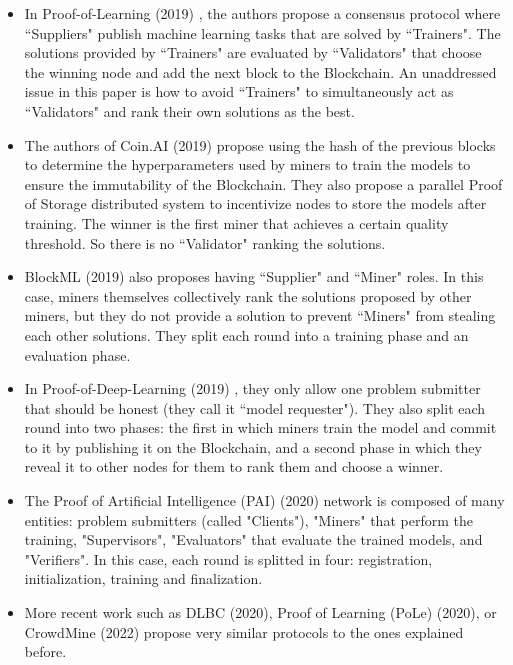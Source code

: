 \documentclass[conference]{IEEEtran}
\begin{document}
\begin{itemize}
\item In Proof-of-Learning (2019) \cite{b7}, the authors propose a consensus protocol where ``Suppliers" publish machine learning tasks that are solved by ``Trainers". The solutions provided by ``Trainers" are evaluated by ``Validators" that choose the winning node and add the next block to the Blockchain. An unaddressed issue in this paper is how to avoid ``Trainers" to simultaneously act as ``Validators" and rank their own solutions as the best.
\item The authors of Coin.AI (2019) \cite{b8} propose using the hash of the previous blocks to determine the hyperparameters used by miners to train the models to ensure the immutability of the Blockchain. They also propose a parallel Proof of Storage distributed system to incentivize nodes to store the models after training. The winner is the first miner that achieves a certain quality threshold. So there is no ``Validator" ranking the solutions.
\item BlockML (2019) \cite{b9} also proposes having ``Supplier" and ``Miner" roles. In this case, miners themselves collectively rank the solutions proposed by other miners, but they do not provide a solution to prevent ``Miners" from stealing each other solutions. They split each round into a training phase and an evaluation phase.
\item In Proof-of-Deep-Learning (2019) \cite{b10}, they only allow one problem submitter that should be honest (they call it ``model requester"). They also split each round into two phases: the first in which miners train the model and commit to it by publishing it on the Blockchain, and a second phase in which they reveal it to other nodes for them to rank them and choose a winner.
\item The Proof of Artificial Intelligence (PAI) (2020) \cite{b11} network is composed of many entities: problem submitters (called "Clients"), "Miners" that perform the training, "Supervisors", "Evaluators" that evaluate the trained models, and "Verifiers". In this case, each round is splitted in four: registration, initialization, training and finalization.
\item More recent work such as DLBC (2020)\cite{b12}, Proof of Learning (PoLe) (2020)\cite{b13}, or CrowdMine (2022)\cite{b14} propose very similar protocols to the ones explained before.

\end{itemize}
\end{document}
